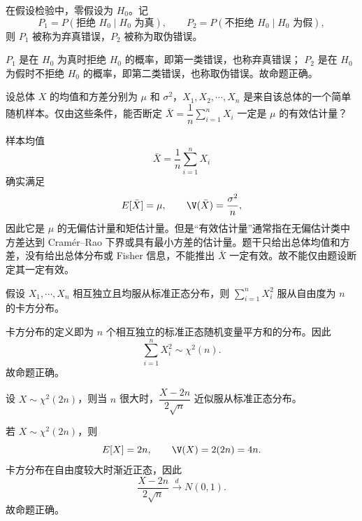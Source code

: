 
\begin{question}
在假设检验中，零假设为 $H_0$。记
\[
P_1=P(\text{拒绝 }H_0\mid H_0\text{ 为真}),
\qquad
P_2=P(\text{不拒绝 }H_0\mid H_0\text{ 为假}),
\]
则 $P_1$ 被称为弃真错误，$P_2$ 被称为取伪错误。
\begin{solution}
$P_1$ 是在 $H_0$ 为真时拒绝 $H_0$ 的概率，即第一类错误，也称弃真错误；
$P_2$ 是在 $H_0$ 为假时不拒绝 $H_0$ 的概率，即第二类错误，也称取伪错误。故命题正确。
\end{solution}
\end{question}

\begin{question}
设总体 $X$ 的均值和方差分别为 $\mu$ 和 $\sigma^2$，$X_1,X_2,\cdots,X_n$ 是来自该总体的一个简单随机样本。仅由这些条件，能否断定 $\bar X=\dfrac1n\sum_{i=1}^n X_i$ 一定是 $\mu$ 的有效估计量？
\begin{solution}
样本均值
\[
\bar X=\frac1n\sum_{i=1}^nX_i
\]
确实满足
\[
E[\bar X]=\mu,
\qquad
\V(\bar X)=\frac{\sigma^2}{n},
\]
因此它是 $\mu$ 的无偏估计量和矩估计量。但是“有效估计量”通常指在无偏估计类中方差达到 Cram\'er--Rao 下界或具有最小方差的估计量。题干只给出总体均值和方差，没有给出总体分布或 Fisher 信息，不能推出 $\bar X$ 一定有效。故不能仅由题设断定其一定有效。
\end{solution}
\end{question}

\begin{question}
假设 $X_1,\cdots,X_n$ 相互独立且均服从标准正态分布，则 $\sum_{i=1}^nX_i^2$ 服从自由度为 $n$ 的卡方分布。
\begin{solution}
卡方分布的定义即为 $n$ 个相互独立的标准正态随机变量平方和的分布。因此
\[
\sum_{i=1}^nX_i^2\sim \chi^2(n).
\]
故命题正确。
\end{solution}
\end{question}

\begin{question}
设 $X\sim\chi^2(2n)$，则当 $n$ 很大时，$\dfrac{X-2n}{2\sqrt n}$ 近似服从标准正态分布。
\begin{solution}
若 $X\sim\chi^2(2n)$，则
\[
E[X]=2n,
\qquad
\V(X)=2(2n)=4n.
\]
卡方分布在自由度较大时渐近正态，因此
\[
\frac{X-2n}{2\sqrt n}\xrightarrow[]{d}N(0,1).
\]
故命题正确。
\end{solution}
\end{question}

